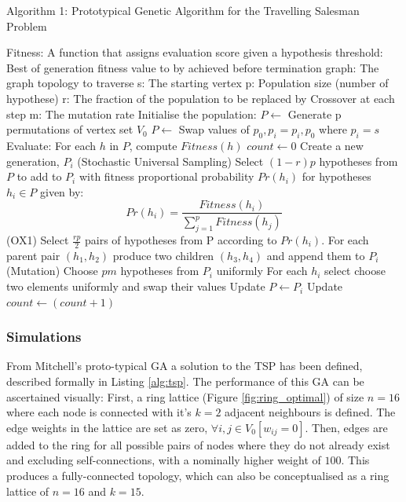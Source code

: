 \documentclass[
	a4paper, %
	10pt, %
	unnumberedsections, %
	twoside, %
]{LTJournalArticle}
\begin{document}
\begin{algorithm}[H]
	\caption{Algorithm 1: Prototypical Genetic Algorithm for the Travelling Salesman Problem}
	\begin{algorithmic}[1]
			\State Fitness: A function that assigns evaluation score given a hypothesis 
			\State threshold: Best of generation fitness value to by achieved before termination 
			\State graph: The graph topology to traverse
			\State s: The starting vertex 
			\State p: Population size (number of hypothese)
			\State r: The fraction of the population to be replaced by Crossover at each step
			\State m: The mutation rate 
			\State Initialise the population: 
				\State \(P \leftarrow\) Generate p permutations of vertex set \(V_{0}\) 
				\State \(P \leftarrow\) Swap values of \(p_{0}, p_{i} = p_{i}, p_{0}\) where \(p_{i} = s\) 
			\State Evaluate: For each $h$ in $P$, compute $Fitness(h)$
			\State $count \leftarrow 0$ 
				\State Create a new generation, 
				$P_{i}$
				\State (Stochastic Universal Sampling) Select $(1 - r)p$ hypotheses from $P$ to add to $P_{i}$ with fitness proportional probability $Pr(h_{i})$ for hypotheses $h_{i} \in P$ given by: 
					\State \[ Pr(h_{i}) = \frac{Fitness(h_{i})}{\sum_{j=1}^{p} Fitness(h_{j})} \]
				\State (OX1) Select $\frac{rp}{2}$ pairs of hypotheses from P according to $Pr(h_{i})$. 
						\State For each parent pair $(h_{1}, h_{2})$ produce two children $(h_{3}, h_{4})$ and append them to $P_{i}$
					\State (Mutation) Choose $pm$ hypotheses from $P_{i}$ uniformly
						\State For each $h_{i}$ select choose two elements uniformly and swap their values 
					\State Update $P \leftarrow P_{i}$
					\State Update $count \leftarrow (count + 1)$ 
			 \EndWhile  \label{Generation Loop}
		\EndProcedure			
	\end{algorithmic}
	\label{alg:tsp} 
\end{algorithm}

\subsubsection{Simulations} 

From Mitchell's proto-typical GA \cite{mitchell:97} a solution to the TSP has been defined, described formally in Listing \ref{alg:tsp}. The performance of this GA can be ascertained visually: First, a ring lattice (Figure \ref{fig:ring_optimal}) of size \(n = 16\) where each node is connected with it's \(k = 2\) adjacent neighbours is defined. The edge weights in the lattice are set as zero, \(\forall i, j \in V_{0} [w_{ij} = 0]\). Then, edges are added to the ring for all possible pairs of nodes where they do not already exist and excluding self-connections, with a nominally higher weight of \(100\). This produces a fully-connected topology, which can also be conceptualised as a ring lattice of \(n = 16\) and \(k = 15\). \\
\end{document}
